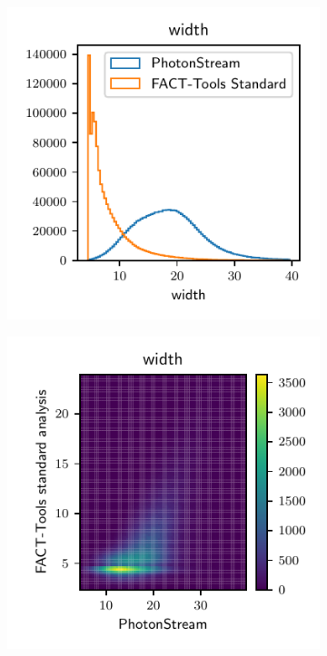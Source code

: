 \begin{figure}
\begin{subfigure}{0.5\textwidth}
    \includegraphics[width=\textwidth, page=2]{Plots/std_phs_comparison_hist_same_DBSCAN_crab.pdf}
  \end{subfigure}
  \begin{subfigure}{0.5\textwidth}
    \centering
    \includegraphics[width=\textwidth, page=1]{Plots/std_phs_comparison_DBSCAN_crab.pdf}

\end{subfigure}
\end{figure}
